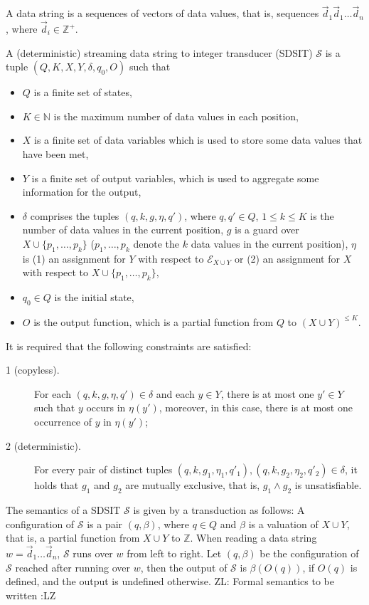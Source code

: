 \documentclass[11pt]{article}
\def\Ee{{\mathcal{E} }}
\def\Nn{{\mathbb{N} }}
\def\Ss{{\mathcal{S} }}
\def\Ii{{\mathbb{Z} }}
\newcommand{\zhilin}[1]{\color{cyan} {ZL: #1 :LZ} \color{black}}
\newcommand{\lei}[1]{\color{green} {LE: #1 :EL} \color{black}}
\begin{document}
A data string is a sequences of vectors of data values, that is, sequences $\vec{d}_1\vec{d}_1\dots \vec{d}_n$, where $\vec{d}_i \in \Ii^+$.

A (deterministic) streaming data string to integer transducer (SDSIT) $\Ss$ is a tuple $(Q, K, X, Y, \delta, q_0, O)$ such that 
\begin{itemize}
\item $Q$ is a finite set of states,
\item $K \in \Nn$ is the maximum number of data values in each position, 
\item $X$ is a finite set of data variables which is used to store some data values that have been met,
\item $Y$ is a finite set of output variables, which is used to aggregate some information for the output,
\item $\delta$ comprises the tuples $(q, k, g, \eta, q')$, where $q,q'\in Q $, $1 \le k \le K$ is the number of data values in the current position, $g$ is a guard over $X \cup \{p_1,\dots,p_k\}$ ($p_1,\dots,p_k$ denote the $k$ data values in the current position), $\eta$ is (1) an assignment for $Y$ with respect to $\Ee_{X \cup Y}$ or (2) an assignment for $X$ with respect to $X \cup \{p_1,\dots,p_k\}$, 
\item $q_0 \in Q$ is the initial state,
\item $O$ is the output function, which is a partial function from $Q$ to $(X \cup Y)^{\le K}$.
\end{itemize}
It is required that the following constraints are satisfied: 
\begin{description}
\item[1 (copyless).] For each $(q,k, g, \eta, q') \in \delta$ and each $y \in Y$, there is at most one $y' \in Y$ such that $y$ occurs in $\eta(y')$, moreover, in this case, there is at most one occurrence of $y$ in $\eta(y')$; 
\item [2 (deterministic).] For every pair of distinct tuples $(q,k, g_1, \eta_1,q'_1), (q, k, g_2,\eta_2,q'_2) \in \delta$, it holds that $g_1$ and $g_2$ are mutually exclusive, that is, $g_1 \wedge g_2$ is unsatisfiable.
\end{description}

The semantics of a SDSIT $\Ss$  is given by a transduction as follows: A configuration of $\Ss$ is a pair $(q,\beta)$, where $q \in Q$ and $\beta$ is a valuation of $X \cup Y$, that is, a partial function from $X \cup Y$ to $\Ii$. When reading a data string $w=\vec{d}_1 \dots \vec{d}_n$, $\Ss$ runs over $w$ from left to right. Let $(q, \beta)$ be the configuration of $\Ss$ reached after running over $w$, then the output of $\Ss$ is $\beta(O(q))$, if $O(q)$ is defined, and the output is undefined otherwise. \zhilin{Formal semantics to be written}
\end{document}
